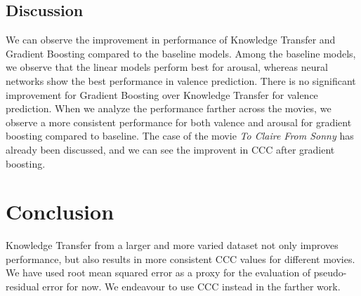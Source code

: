 \documentclass{article}
\begin{document}
\subsection{Discussion}
We can observe the improvement in performance of Knowledge Transfer and Gradient Boosting compared to the baseline models. Among the baseline models, we observe that the linear models perform best for arousal, whereas neural networks show the best performance in valence prediction. There is no significant improvement for Gradient Boosting over Knowledge Transfer for valence prediction. When we analyze the performance farther across the movies, we observe a more consistent performance for both valence and arousal for gradient boosting compared to baseline. The case of the movie \textit{To Claire From Sonny} has already been discussed, and we can see the improvent in CCC after gradient boosting.

\section{Conclusion}
Knowledge Transfer from a larger and more varied dataset not only improves performance, but also results in more consistent CCC values for different movies. We have used root mean squared error as a proxy for the evaluation of pseudo-residual error for now. We endeavour to use CCC instead in the farther work. 

\footnotesize{
\begin{spacing}{.85 }


\end{spacing}
}
\end{document}
